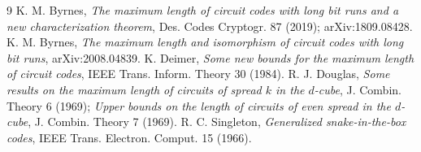 \documentclass[11pt]{article}
\theoremstyle{remark}
\begin{document}
\begin{thebibliography}{9}
 K. M. Byrnes, \emph{The maximum length of circuit codes with long bit runs and a new characterization theorem},
Des. Codes Cryptogr. 87 (2019); arXiv:1809.08428.
 K. M. Byrnes, \emph{The maximum length and isomorphism of circuit codes with long bit runs}, arXiv:2008.04839.
 K. Deimer, \emph{Some new bounds for the maximum length of circuit codes}, IEEE Trans. Inform. Theory 30 (1984).
 R. J. Douglas, \emph{Some results on the maximum length of circuits of spread $k$ in the $d$-cube}, J. Combin. Theory 6 (1969);
\emph{Upper bounds on the length of circuits of even spread in the $d$-cube}, J. Combin. Theory 7 (1969).
 R. C. Singleton, \emph{Generalized snake-in-the-box codes}, IEEE Trans. Electron. Comput. 15 (1966).
\end{thebibliography}
\end{document}
